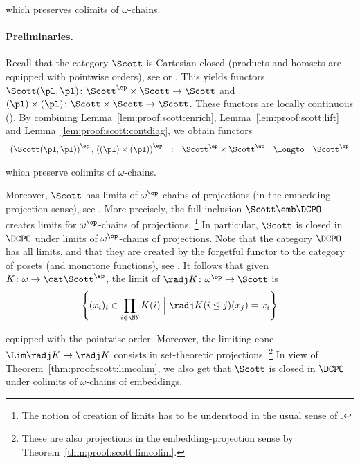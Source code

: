 \noindent
which preserves colimits of $\omega$-chains.


\paragraph{Preliminaries.}
Recall that the category $\Scott$ is Cartesian-closed
(products and homsets are equipped with pointwise orders),
see \cite[Corollary 4.1.6]{aj95chapter} or \cite[\S 1.4]{ac98book}.
This yields functors
$\Scott(\pl,\pl) \colon \Scott^\op \times \Scott \to \Scott$
and
$(\pl) \times (\pl) \colon \Scott \times \Scott \to \Scott$.
These functors are locally continuous
(\cite[Example 7.1.16]{ac98book}).
By combining Lemma~\ref{lem:proof:scott:enrich},
Lemma~\ref{lem:proof:scott:lift} and Lemma~\ref{lem:proof:scott:contdiag},
we obtain functors
\[
\begin{array}{*{5}{l}}
  \left(\Scott(\pl,\pl) \right)^\ep
  ,\,
  \left( (\pl) \times (\pl) \right)^\ep
& :
& \Scott^\ep \times \Scott^\ep
& \longto
& \Scott^\ep
\end{array}
\]

\noindent
which preserve colimits of $\omega$-chains.

Moreover, $\Scott$ has limits of $\omega^\op$-chains
of projections (in the embedding-projection sense),
see \cite[Theorem 3.3.7, Theorem 3.3.11 and Proposition 4.1.3]{aj95chapter}.
%
More precisely, the full inclusion $\Scott \emb \DCPO$
creates limits for $\omega^\op$-chains of projections.%
\footnote{The notion of creation of limits has to be understood in the usual
sense of \cite[Definition V.1]{maclane98book}.}
%
In particular, $\Scott$
is closed in $\DCPO$ under limits of $\omega^\op$-chains of projections.
%
Note that the category $\DCPO$ has all limits,
and that they are created by the forgetful functor to the category
of posets (and monotone functions),
see \cite[Theorem 3.3.1]{aj95chapter}.
%
It follows that given $K \colon \omega \to \cat \Scott^\ep$,
the limit of $\radj K \colon \omega^\op \to \Scott$
is
\[
  \left\{
  (x_i)_i \in \prod_{i \in \NN} K(i)
  \mathrel{\Big|}
  \radj K(i \leq j)(x_j) = x_i
  \right\}
\]

\noindent
equipped with the pointwise order.
Moreover, the limiting
cone $\Lim \radj K \to \radj K$ 
consists in set-theoretic projections.%
\footnote{These are also projections in the embedding-projection sense
by Theorem~\ref{thm:proof:scott:limcolim}.}
In view of Theorem~\ref{thm:proof:scott:limcolim},
we also get that $\Scott$ is closed in $\DCPO$
under colimits of $\omega$-chains of embeddings.

